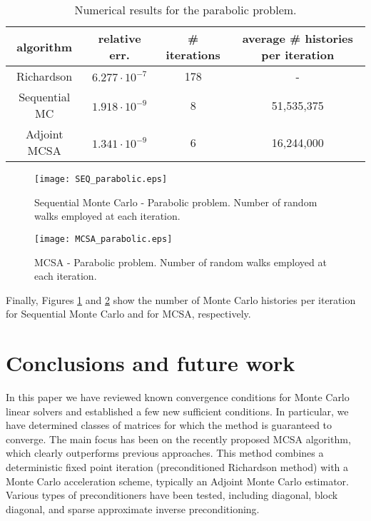 \documentclass[final,leqno,onefignum,onetabnum]{siamltex1213}
\begin{document}
\begin{table}[!t]
\centering
\hspace*{-0.8cm}
\begin{tabular}{|c|c|c|c|}
\hline
algorithm & relative err.& \# iterations & average \# histories per iteration\\
\hline
 Richardson & $6.277\cdot 10^{-7}$ & 178 & - \\
 \hline
 Sequential MC & $1.918 \cdot 10^{-9}$ & 8 & 51,535,375\\
\hline
 Adjoint MCSA & $1.341\cdot 10^{-9}$ & 6 & 16,244,000\\
\hline
\end{tabular}
\caption{Numerical results for the parabolic problem.}
\label{parabolic_results}
\end{table}


\begin{figure}
  \centering
    \texttt{[image: SEQ\_parabolic.eps]}
      \caption{Sequential Monte Carlo - Parabolic problem. Number of random
walks
employed at each
iteration.}
\label{SEQ_parabolic}
\end{figure}


\begin{figure}
  \centering
    \texttt{[image: MCSA\_parabolic.eps]}
      \caption{MCSA - Parabolic problem. Number of random walks
employed at each
iteration.}
\label{MCSA_parabolic}
\end{figure}

Finally, Figures \ref{SEQ_parabolic} and \ref{MCSA_parabolic} 
show the number of Monte Carlo histories per iteration 
for Sequential Monte Carlo
and for MCSA, respectively.

\section{Conclusions and future work}
\label{sec:conclusion}

In this paper we have reviewed known convergence conditions for Monte Carlo linear
solvers and established a few new sufficient conditions. In particular, we
have determined classes of matrices for which the method  is guaranteed
to converge. The main focus has
been on the recently proposed MCSA algorithm, which clearly outperforms
previous approaches. This method combines a deterministic fixed point
iteration (preconditioned Richardson method) with a Monte Carlo 
acceleration scheme, typically an Adjoint Monte Carlo estimator. Various
types of preconditioners have been tested, including diagonal, block
diagonal, and sparse approximate inverse preconditioning.  
\end{document}
